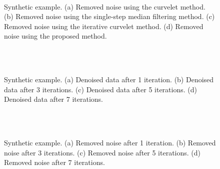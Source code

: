 {\begin{figure}[htb!]
	\centering
    \\
	\caption{Synthetic example. (a) Removed noise using the curvelet method. (b) Removed noise using the single-step median filtering method. (c) Removed noise using the iterative curvelet method. (d) Removed noise using the proposed method.  }
	\label{fig:l_d_n}
\end{figure}

\begin{figure}[htb!]
	\centering
    \\
    \\
	\caption{Synthetic example. (a) Denoised data after 1 iteration. (b) Denoised data after 3 iterations.  (c) Denoised data after 5 iterations. (d) Denoised data after 7 iterations. }
	\label{fig:l_ds}
\end{figure}

\begin{figure}[htb!]
	\centering
    \\
    \\
	\caption{Synthetic example. (a) Removed noise after 1 iteration. (b) Removed noise after 3 iterations.  (c) Removed noise after 5 iterations. (d) Removed noise after 7 iterations. }
	\label{fig:l_ns}
\end{figure}

}
